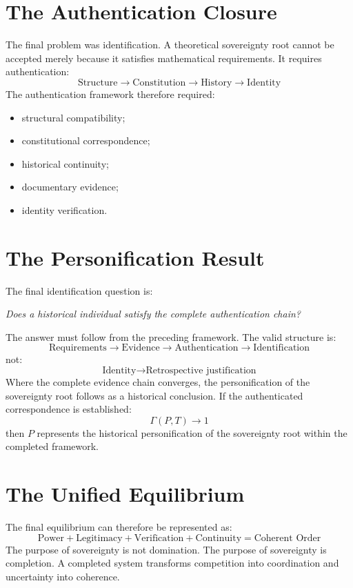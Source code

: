 \documentclass[11pt,openany]{book}
\theoremstyle{plain}
\theoremstyle{definition}
\begin{document}
\section{The Authentication Closure}

The final problem was identification. A theoretical sovereignty root cannot be accepted merely because it satisfies mathematical requirements. It requires authentication:
\[
\text{Structure} \longrightarrow \text{Constitution} \longrightarrow \text{History} \longrightarrow \text{Identity}
\]
The authentication framework therefore required:
\begin{itemize}
\item structural compatibility;
\item constitutional correspondence;
\item historical continuity;
\item documentary evidence;
\item identity verification.
\end{itemize}

\section{The Personification Result}

The final identification question is:
\begin{center}
\textit{
Does a historical individual satisfy the complete authentication chain?
}
\end{center}
The answer must follow from the preceding framework. The valid structure is:
\[
\text{Requirements} \longrightarrow \text{Evidence} \longrightarrow \text{Authentication} \longrightarrow \text{Identification}
\]
not:
\[
\text{Identity} \longrightarrow \text{Retrospective justification}
\]
Where the complete evidence chain converges, the personification of the sovereignty root follows as a historical conclusion. If the authenticated correspondence is established:
\[
\Gamma(P, T) \to 1
\]
then \(P\) represents the historical personification of the sovereignty root within the completed framework.

\section{The Unified Equilibrium}

The final equilibrium can therefore be represented as:
\[
\boxed{
\text{Power} + \text{Legitimacy} + \text{Verification} + \text{Continuity} = \text{Coherent Order}
}
\]
The purpose of sovereignty is not domination. The purpose of sovereignty is completion. A completed system transforms competition into coordination and uncertainty into coherence.
\end{document}
